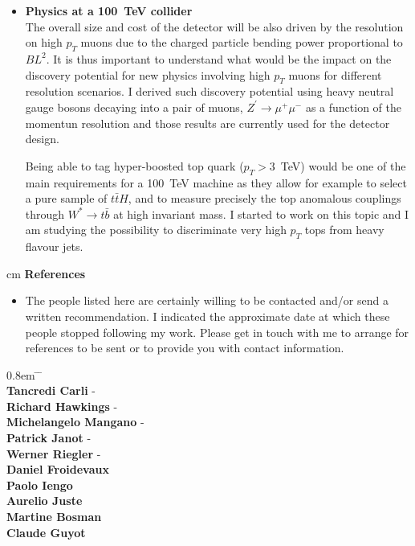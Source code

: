 \documentclass[12pt]{article}
\begin{document}
\begin{itemize}[leftmargin=1.3cm]
\item[] {\bf Physics at a 100~TeV collider}\\
The overall size and cost of the detector will be also driven by the resolution on high $p_T$ muons due to the charged particle bending power proportional to $BL^2$.
It is thus important to understand what would be the impact on the discovery potential for new physics involving high $p_T$ muons for different resolution scenarios. 
I derived such discovery potential using heavy neutral gauge bosons decaying into a pair of muons, $Z^{\prime} \rightarrow \mu^{+}\mu^{-}$ as a function of the momentun resolution 
and those results are currently used for the detector design.
 \vspace{2.5mm}

Being able to tag hyper-boosted top quark ($p_T > 3$~TeV) would be one of the main requirements for a 100~TeV machine as they allow for example to select a pure 
sample of $t\bar{t}H$, and to measure precisely the top anomalous couplings through $W^* \rightarrow t\bar{b}$ at high invariant mass.
I started to work on this topic and I am studying  the possibility to discriminate very high $p_T$ tops from heavy flavour jets.

\end{itemize}







 cm
{\bf \large References}
\vskip 0.2cm
\begin{itemize}[leftmargin=1.3cm]
\item[] The people listed here are certainly willing to be contacted and/or send a written recommendation. I indicated the approximate date at which these people stopped following my work.
Please get in touch with me to arrange for references to be sent or to provide you with contact information.
\end{itemize}

\begin{tabbing}
\itemsep0.8em
 \hskip 1.3cm  \=  \hskip 5.3cm \=  \hskip 1.5cm  \=\\ 
\> {\bf Tancredi Carli}  \> \> - \\
\> {\bf Richard Hawkings}  \> \> - \\
\> {\bf Michelangelo Mangano}  \>\> - \\
\> {\bf Patrick Janot}  \>\> - \\
\> {\bf Werner Riegler}  \> \> - \\
\> {\bf Daniel Froidevaux}  \>    \\
\> {\bf Paolo Iengo}  \>  \\
\> {\bf Aurelio Juste}  \>  \\
\> {\bf Martine Bosman}  \>  \\
\> {\bf Claude Guyot} \>  

\end{tabbing}
\end{document}
